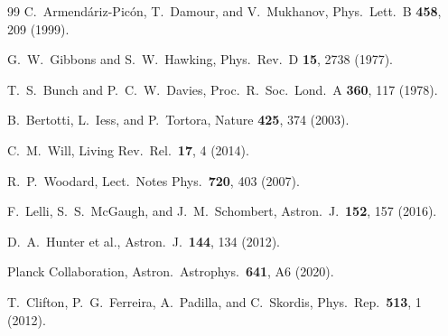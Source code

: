 \documentclass[11pt,a4paper]{article}
\begin{document}
\begin{thebibliography}{99}
  C.~Armend\'ariz-Pic\'on, T.~Damour, and V.~Mukhanov,
  Phys.\ Lett.\ B \textbf{458}, 209 (1999).

  G.~W.~Gibbons and S.~W.~Hawking,
  Phys.\ Rev.\ D \textbf{15}, 2738 (1977).

  T.~S.~Bunch and P.~C.~W.~Davies,
  Proc.\ R.\ Soc.\ Lond.\ A \textbf{360}, 117 (1978).

  B.~Bertotti, L.~Iess, and P.~Tortora,
  Nature \textbf{425}, 374 (2003).

  C.~M.~Will,
  Living Rev.\ Rel.\ \textbf{17}, 4 (2014).

  R.~P.~Woodard,
  Lect.\ Notes Phys.\ \textbf{720}, 403 (2007).

  F.~Lelli, S.~S.~McGaugh, and J.~M.~Schombert,
  Astron.\ J.\ \textbf{152}, 157 (2016).

  D.~A.~Hunter et al.,
  Astron.\ J.\ \textbf{144}, 134 (2012).

  Planck Collaboration,
  Astron.\ Astrophys.\ \textbf{641}, A6 (2020).

  T.~Clifton, P.~G.~Ferreira, A.~Padilla, and C.~Skordis,
  Phys.\ Rep.\ \textbf{513}, 1 (2012).

\end{thebibliography}
\end{document}
